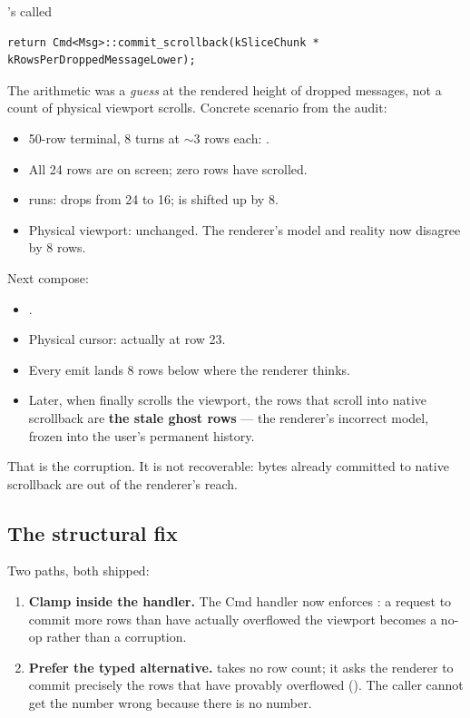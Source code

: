 \agentty{}'s  called

\begin{lstlisting}
return Cmd<Msg>::commit_scrollback(kSliceChunk * kRowsPerDroppedMessageLower);
\end{lstlisting}

The arithmetic was a \emph{guess} at the rendered height of dropped
messages, not a count of physical viewport scrolls. Concrete
scenario from the audit:

\begin{itemize}[leftmargin=*]
  \item 50-row terminal, 8 turns at $\sim$3 rows each:
    .
  \item All 24 rows are on screen; zero rows have scrolled.
  \item {} runs: 
    drops from 24 to 16;  is shifted up by 8.
  \item Physical viewport: unchanged. The renderer's model and
    reality now disagree by 8 rows.
\end{itemize}

Next compose:

\begin{itemize}[leftmargin=*]
  \item {}.
  \item Physical cursor: actually at row 23.
  \item Every emit lands 8 rows below where the renderer thinks.
  \item Later, when  finally
    scrolls the viewport, the rows that scroll into native
    scrollback are \textbf{the stale ghost rows} --- the renderer's
    incorrect model, frozen into the user's permanent history.
\end{itemize}

That is the corruption. It is not recoverable: bytes already
committed to native scrollback are out of the renderer's reach.

\subsection{The structural fix}

Two paths, both shipped:

\begin{enumerate}[leftmargin=*]
  \item \textbf{Clamp inside the handler.} The Cmd handler now
    enforces : a
    request to commit more rows than have actually overflowed the
    viewport becomes a no-op rather than a corruption.
  \item \textbf{Prefer the typed alternative.}
     takes no row count;
    it asks the renderer to commit precisely the rows that have
    provably overflowed (). The caller
    cannot get the number wrong because there is no number.
\end{enumerate}

